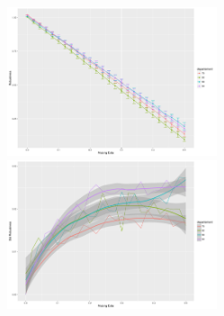 \begin{figure}
\centering
\hspace{-2cm}\includegraphics[width=0.55\textwidth]{Figures/RobustnessDiscrepancy/alldeps_rob_renormindics.pdf}
\includegraphics[width=0.55\textwidth]{Figures/RobustnessDiscrepancy/alldeps_robsd_renormindics.pdf}\hspace{-2cm}
\caption{}

\end{figure}
